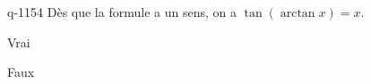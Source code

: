 \begin{truefalse}{q-1154}
Dès que la formule a un sens, on a $\tan(\arctan x) = x$.
\item* Vrai
\item Faux
\end{truefalse}

